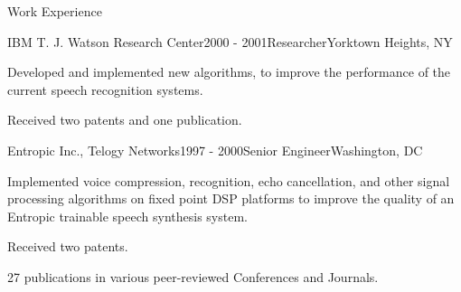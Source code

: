 \documentclass{template} %
\begin{document}
\begin{rSection}{Work Experience}
\begin{rSubsection}{IBM T. J. Watson Research Center}{2000 - 2001}{Researcher}{Yorktown Heights, NY}
\item Developed and implemented new algorithms, to improve the performance of the current speech recognition systems. 
\item Received two patents and one publication.
\end{rSubsection}

\begin{rSubsection}{Entropic Inc., Telogy Networks}{1997 - 2000}{Senior Engineer}{Washington, DC}
\item Implemented voice compression, recognition, echo cancellation, and other signal processing algorithms on fixed point DSP platforms to improve the quality of an Entropic trainable speech synthesis system. 
\item Received two patents.
\end{rSubsection}

27 publications in various peer-reviewed Conferences and Journals. 
\end{rSection}
\vspace{-2mm}





\end{document}
